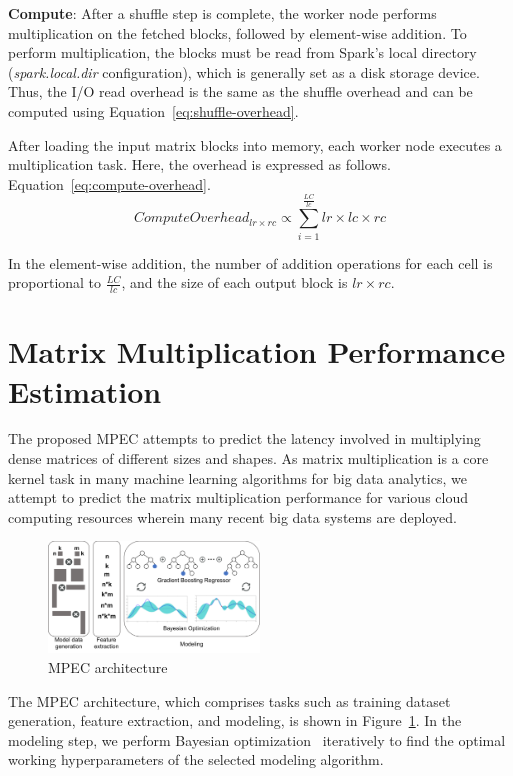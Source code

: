 \documentclass[10pt, conference, compsocconf]{IEEEtran}
\begin{document}
\textbf{Compute}: After a shuffle step is complete, the worker node performs multiplication on the fetched blocks, followed by element-wise addition. To perform multiplication, the blocks must be read from Spark's local directory (\textit{spark.local.dir} configuration), which is generally set as a disk storage device. Thus, the I/O read overhead is the same as the shuffle overhead and can be computed using Equation~\ref{eq:shuffle-overhead}.

After loading the input matrix blocks into memory, each worker node executes a multiplication task. Here, the overhead is expressed as follows. Equation~\ref{eq:compute-overhead}.
\begin{equation}\label{eq:compute-overhead}
  ComputeOverhead_{lr \times rc} \propto \sum\limits_{i=1}^{\frac{LC}{lc}} lr \times lc \times rc
\end{equation}

In the element-wise addition, the number of addition operations for each cell is proportional to $\frac{LC}{lc}$, and the size of each output block is $lr \times rc$.

\section{Matrix Multiplication Performance Estimation}\label{sec:mpc-structure}The proposed MPEC attempts to predict the latency involved in multiplying dense matrices of different sizes and shapes. As matrix multiplication is a core kernel task in many machine learning algorithms for big data analytics, we attempt to predict the matrix multiplication performance for various cloud computing resources wherein many recent big data systems are deployed.
\begin{figure}
  \centering\includegraphics[width=0.5\textwidth]{figures/mpc-architecture.pdf}\caption{MPEC architecture}\label{fig:mpc-architecture}
\end{figure}

The MPEC architecture, which comprises tasks such as training dataset generation, feature extraction, and modeling, is shown in Figure~\ref{fig:mpc-architecture}. In the modeling step, we perform Bayesian optimization~\cite{bayesian-optimization} iteratively to find the optimal working hyperparameters of the selected modeling algorithm.
\end{document}
